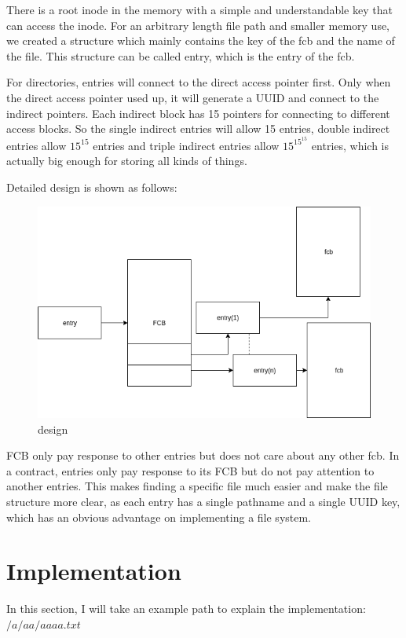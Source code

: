 \documentclass[legalpaper]{article}
\begin{document}
	There is a root inode in the memory with a simple and understandable key that can access the inode. For an arbitrary length file path and smaller memory use, we created a structure which mainly contains the key of the fcb and the name of the file.  This structure can be called entry, which is the entry of the fcb.\par
	For directories, entries will connect to the direct access pointer first. Only when the direct access pointer used up, it will generate a UUID and connect to the indirect pointers. Each indirect block has 15 pointers for connecting to different access blocks. So the single indirect entries will allow 15 entries, double indirect entries allow $15^{15}$ entries and triple indirect entries allow $15^{15^{15}}$ entries, which is actually big enough for storing all kinds of things.\par
	Detailed design is shown as follows:\par
	\begin{figure}[H]
	\centering
	\includegraphics[width = \textwidth]{addnode}
	\caption{design}
	\end{figure}
	FCB only pay response to other entries but does not care about any other fcb. In a contract, entries only pay response to its FCB but do not pay attention to another entries. This makes finding a specific file much easier and make the file structure more clear, as each entry has a single pathname and a single UUID key, which has an obvious advantage on implementing a file system.
	\section{Implementation}
	In this section, I will take an example path to explain the implementation: $/a/aa/aaaa.txt$
\end{document}
